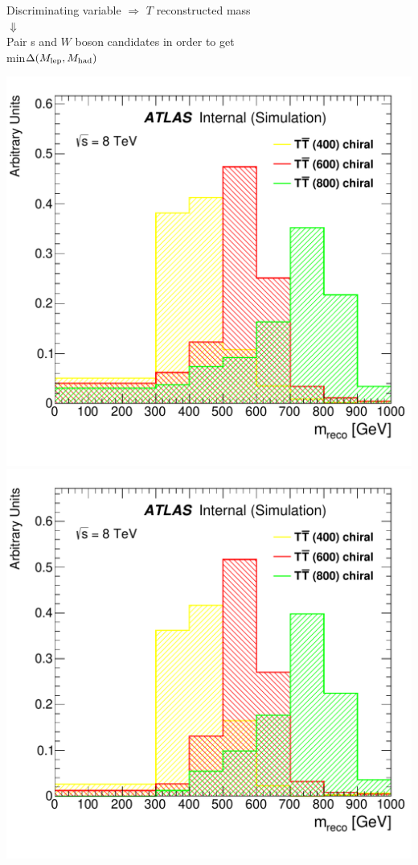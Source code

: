 \begin{frame}
\begin{minipage}{.6\textwidth}
\myskip

\footnotesize
Discriminating variable $\Rightarrow$ {\cccolor $T$ reconstructed mass}\\
{\large$\Downarrow$}\\
Pair \bjet s and $W$ boson candidates in order to get\\
min$\Delta(M_{\rm lep},M_{\rm had})$

\end{minipage}\begin{minipage}{.4\textwidth}\centering

\includegraphics[width=.8\textwidth]{pics/VLQAna_WbX_1W_MWb_4_ELEMUONloose_1W_NOMINAL_VLTtt.pdf}\\
\includegraphics[width=.8\textwidth]{pics/VLQAna_WbX_1W_MWb_4_ELEMUONtight_1W_NOMINAL_VLTtt.pdf}
\end{minipage}

\end{frame}



